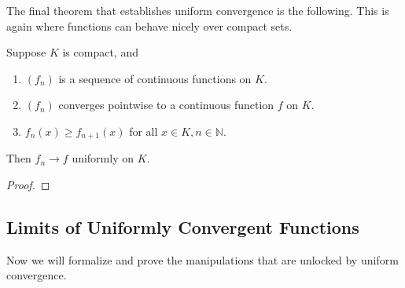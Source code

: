   The final theorem that establishes uniform convergence is the following. This is again where functions can behave nicely over compact sets. 

  \begin{theorem}
    Suppose $K$ is compact, and 
    \begin{enumerate}
      \item $(f_n)$ is a sequence of continuous functions on $K$. 
      \item $(f_n)$ converges pointwise to a continuous function $f$ on $K$. 
      \item $f_n (x) \geq f_{n+1} (x)$ for all $x \in K, n \in \mathbb{N}$. 
    \end{enumerate}
    Then $f_n \to f$ uniformly on $K$. 
  \end{theorem} 
  \begin{proof}
    
  \end{proof}

\subsection{Limits of Uniformly Convergent Functions} 

  Now we will formalize and prove the manipulations that are unlocked by uniform convergence. 

